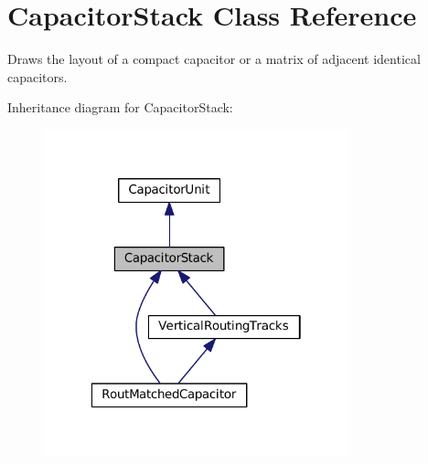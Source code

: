 \hypertarget{classpython_1_1capacitormatrix_1_1CapacitorStack}{}\section{Capacitor\+Stack Class Reference}
\label{classpython_1_1capacitormatrix_1_1CapacitorStack}


Draws the layout of a compact capacitor or a matrix of adjacent identical capacitors.  




Inheritance diagram for Capacitor\+Stack\+:
\nopagebreak
\begin{figure}[H]
\begin{center}
\leavevmode
\includegraphics[width=250pt]{classpython_1_1capacitormatrix_1_1CapacitorStack__inherit__graph}
\end{center}
\end{figure}
